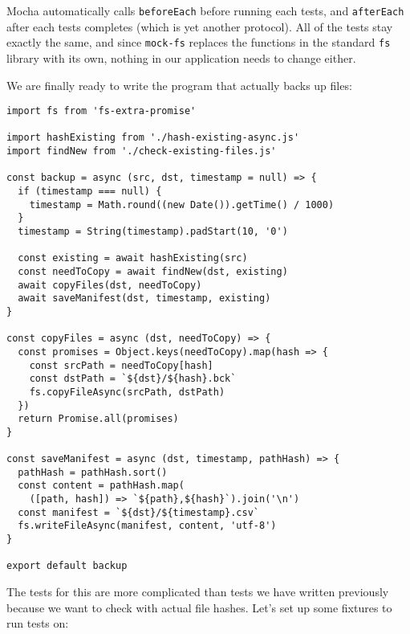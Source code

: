 \documentclass[krantzl]{krantz}
\begin{document}
\noindent Mocha automatically calls \texttt{beforeEach} before running each tests,
and \texttt{afterEach} after each tests completes
(which is yet another protocol).
All of the tests stay exactly the same,
and since \texttt{mock-fs} replaces the functions in the standard \texttt{fs} library with its own,
nothing in our application needs to change either.


We are finally ready to write the program that actually backs up files:


\begin{lstlisting}[frame=single,frameround=tttt]
import fs from 'fs-extra-promise'

import hashExisting from './hash-existing-async.js'
import findNew from './check-existing-files.js'

const backup = async (src, dst, timestamp = null) => {
  if (timestamp === null) {
    timestamp = Math.round((new Date()).getTime() / 1000)
  }
  timestamp = String(timestamp).padStart(10, '0')

  const existing = await hashExisting(src)
  const needToCopy = await findNew(dst, existing)
  await copyFiles(dst, needToCopy)
  await saveManifest(dst, timestamp, existing)
}

const copyFiles = async (dst, needToCopy) => {
  const promises = Object.keys(needToCopy).map(hash => {
    const srcPath = needToCopy[hash]
    const dstPath = `${dst}/${hash}.bck`
    fs.copyFileAsync(srcPath, dstPath)
  })
  return Promise.all(promises)
}

const saveManifest = async (dst, timestamp, pathHash) => {
  pathHash = pathHash.sort()
  const content = pathHash.map(
    ([path, hash]) => `${path},${hash}`).join('\n')
  const manifest = `${dst}/${timestamp}.csv`
  fs.writeFileAsync(manifest, content, 'utf-8')
}

export default backup
\end{lstlisting}



The tests for this are more complicated than tests we have written previously
because we want to check with actual file hashes.
Let's set up some fixtures to run tests on:
\end{document}
